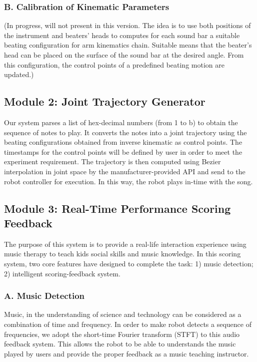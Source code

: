 \subsubsection{B. Calibration of Kinematic Parameters}
(In progress, will not present in this version. The idea is to use both positions 
of the instrument and beaters' heads to computes for each sound bar a suitable 
beating configuration for arm kinematics chain. Suitable means that the beater's 
head can be placed on the surface of the sound bar at the desired angle. From 
this configuration, the control points of a predefined beating motion are updated.)\\ 

\subsection{Module 2: Joint Trajectory Generator}
Our system parses a list of hex-decimal numbers (from 1 to b) to obtain the sequence
of notes to play. It converts the notes into a joint trajectory using the beating
configurations obtained from inverse kinematic as control points. The timestamps
for the control points will be defined by user in order to meet the experiment requirement.
The trajectory is then computed using Bezier interpolation in joint space by the
manufacturer-provided API and send to the robot controller for execution. In this
way, the robot plays in-time with the song.\\

\subsection{Module 3: Real-Time Performance Scoring Feedback}
The purpose of this system is to provide a real-life interaction experience using 
music therapy to teach kids social skills and music knowledge.  In this scoring 
system, two core features have designed to complete the task: 1) music detection;
2) intelligent scoring-feedback system.\\


\subsubsection{A. Music Detection}
Music, in the understanding of science and technology can be considered as a combination 
of time and frequency. In order to make robot detects a sequence of frequencies, we adopt the 
short-time Fourier transform (STFT) to this audio feedback system. This allows the robot to 
be able to understands the music played by users and provide the proper feedback as
a music teaching instructor.\\

